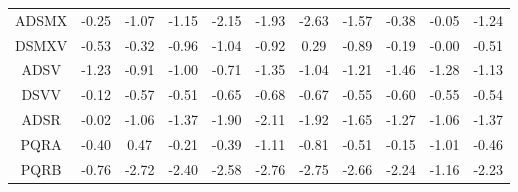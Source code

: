 \documentclass[11pt,a4paper]{report}
\begin{document}
\begin{longtable}{ | c || c | c | c | c | c | c | c | c | c || c |}
ADSMX &  \cellcolor[HTML]{FFF7F7} -0.25 &  \cellcolor[HTML]{FFE7E7} -1.07 &  \cellcolor[HTML]{FFDFDF} -1.15 &  \cellcolor[HTML]{FFC7C7} -2.15 &  \cellcolor[HTML]{FFCFCF} -1.93 &  \cellcolor[HTML]{FFBFBF} -2.63 &  \cellcolor[HTML]{FFD7D7} -1.57 &  \cellcolor[HTML]{FFF7F7} -0.38 &  \cellcolor[HTML]{FFFFFF} -0.05 &  \cellcolor[HTML]{FFDFDF} -1.24 \\
DSMXV &  \cellcolor[HTML]{FFEFEF} -0.53 &  \cellcolor[HTML]{FFF7F7} -0.32 &  \cellcolor[HTML]{FFE7E7} -0.96 &  \cellcolor[HTML]{FFE7E7} -1.04 &  \cellcolor[HTML]{FFE7E7} -0.92 &  \cellcolor[HTML]{F7F7FF} 0.29 &  \cellcolor[HTML]{FFE7E7} -0.89 &  \cellcolor[HTML]{FFF7F7} -0.19 &  \cellcolor[HTML]{FFFFFF} -0.00 &  \cellcolor[HTML]{FFEFEF} -0.51 \\
ADSV &  \cellcolor[HTML]{FFDFDF} -1.23 &  \cellcolor[HTML]{FFE7E7} -0.91 &  \cellcolor[HTML]{FFE7E7} -1.00 &  \cellcolor[HTML]{FFEFEF} -0.71 &  \cellcolor[HTML]{FFDFDF} -1.35 &  \cellcolor[HTML]{FFE7E7} -1.04 &  \cellcolor[HTML]{FFDFDF} -1.21 &  \cellcolor[HTML]{FFD7D7} -1.46 &  \cellcolor[HTML]{FFDFDF} -1.28 &  \cellcolor[HTML]{FFDFDF} -1.13 \\
DSVV &  \cellcolor[HTML]{FFFFFF} -0.12 &  \cellcolor[HTML]{FFEFEF} -0.57 &  \cellcolor[HTML]{FFEFEF} -0.51 &  \cellcolor[HTML]{FFEFEF} -0.65 &  \cellcolor[HTML]{FFEFEF} -0.68 &  \cellcolor[HTML]{FFEFEF} -0.67 &  \cellcolor[HTML]{FFEFEF} -0.55 &  \cellcolor[HTML]{FFEFEF} -0.60 &  \cellcolor[HTML]{FFEFEF} -0.55 &  \cellcolor[HTML]{FFEFEF} -0.54 \\
ADSR &  \cellcolor[HTML]{FFFFFF} -0.02 &  \cellcolor[HTML]{FFE7E7} -1.06 &  \cellcolor[HTML]{FFDFDF} -1.37 &  \cellcolor[HTML]{FFCFCF} -1.90 &  \cellcolor[HTML]{FFC7C7} -2.11 &  \cellcolor[HTML]{FFCFCF} -1.92 &  \cellcolor[HTML]{FFD7D7} -1.65 &  \cellcolor[HTML]{FFDFDF} -1.27 &  \cellcolor[HTML]{FFE7E7} -1.06 &  \cellcolor[HTML]{FFDFDF} -1.37 \\
PQRA &  \cellcolor[HTML]{FFF7F7} -0.40 &  \cellcolor[HTML]{F7F7FF} 0.47 &  \cellcolor[HTML]{FFF7F7} -0.21 &  \cellcolor[HTML]{FFF7F7} -0.39 &  \cellcolor[HTML]{FFDFDF} -1.11 &  \cellcolor[HTML]{FFE7E7} -0.81 &  \cellcolor[HTML]{FFEFEF} -0.51 &  \cellcolor[HTML]{FFFFFF} -0.15 &  \cellcolor[HTML]{FFE7E7} -1.01 &  \cellcolor[HTML]{FFF7F7} -0.46 \\
PQRB &  \cellcolor[HTML]{FFEFEF} -0.76 &  \cellcolor[HTML]{FFB7B7} -2.72 &  \cellcolor[HTML]{FFBFBF} -2.40 &  \cellcolor[HTML]{FFBFBF} -2.58 &  \cellcolor[HTML]{FFB7B7} -2.76 &  \cellcolor[HTML]{FFB7B7} -2.75 &  \cellcolor[HTML]{FFBFBF} -2.66 &  \cellcolor[HTML]{FFC7C7} -2.24 &  \cellcolor[HTML]{FFDFDF} -1.16 &  \cellcolor[HTML]{FFC7C7} -2.23 \\

\end{longtable}
\end{document}
